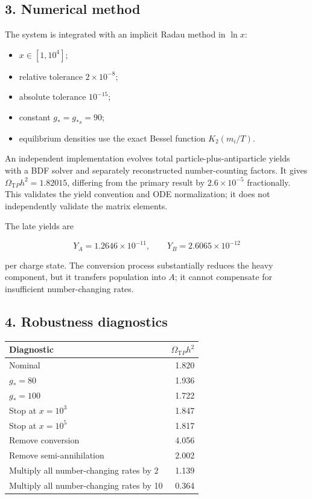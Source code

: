 \documentclass[
]{article}
\providecommand{\tightlist}{%
  \setlength{\itemsep}{0pt}\setlength{\parskip}{0pt}}
\begin{document}
\hypertarget{numerical-method}{%
\subsection{3. Numerical method}\label{numerical-method}}

The system is integrated with an implicit Radau method in \(\ln x\):

\begin{itemize}
\tightlist
\item
  \(x\in[1,10^4]\);
\item
  relative tolerance \(2\times10^{-8}\);
\item
  absolute tolerance \(10^{-15}\);
\item
  constant \(g_*=g_{*s}=90\);
\item
  equilibrium densities use the exact Bessel function \(K_2(m_i/T)\).
\end{itemize}

An independent implementation evolves total particle-plus-antiparticle
yields with a BDF solver and separately reconstructed number-counting
factors. It gives \(\Omega_{\mathrm TP}h^2=1.82015\), differing from the
primary result by \(2.6\times10^{-5}\) fractionally. This validates the
yield convention and ODE normalization; it does not independently
validate the matrix elements.

The late yields are

\[
Y_A=1.2646\times10^{-11},\qquad
Y_B=2.6065\times10^{-12}
\]

per charge state. The conversion process substantially reduces the heavy
component, but it transfers population into \(A\); it cannot compensate
for insufficient number-changing rates.

\hypertarget{robustness-diagnostics}{%
\subsection{4. Robustness diagnostics}\label{robustness-diagnostics}}

\begin{longtable}[]{@{}lr@{}}
\toprule\noalign{}
Diagnostic & \(\Omega_{\mathrm TP}h^2\) \\
\midrule\noalign{}
\endhead
\bottomrule\noalign{}
\endlastfoot
Nominal & 1.820 \\
\(g_*=80\) & 1.936 \\
\(g_*=100\) & 1.722 \\
Stop at \(x=10^3\) & 1.847 \\
Stop at \(x=10^5\) & 1.817 \\
Remove conversion & 4.056 \\
Remove semi-annihilation & 2.002 \\
Multiply all number-changing rates by 2 & 1.139 \\
Multiply all number-changing rates by 10 & 0.364 \\
\end{longtable}
\end{document}
